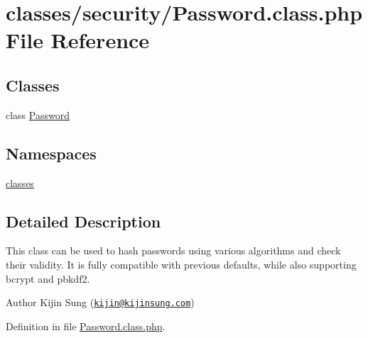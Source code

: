 \hypertarget{Password_8class_8php}{\section{classes/security/\-Password.class.\-php File Reference}
\label{Password_8class_8php}
}
\subsection*{Classes}
\begin{DoxyCompactItemize}
\item 
class \hyperlink{classPassword}{Password}
\end{DoxyCompactItemize}
\subsection*{Namespaces}
\begin{DoxyCompactItemize}
\item 
\hyperlink{namespaceclasses}{classes}
\end{DoxyCompactItemize}


\subsection{Detailed Description}
This class can be used to hash passwords using various algorithms and check their validity. It is fully compatible with previous defaults, while also supporting bcrypt and pbkdf2.

\begin{DoxyAuthor}{Author}
Kijin Sung (\href{mailto:kijin@kijinsung.com}{\tt kijin@kijinsung.\-com}) 
\end{DoxyAuthor}


Definition in file \hyperlink{Password_8class_8php_source}{Password.\-class.\-php}.

